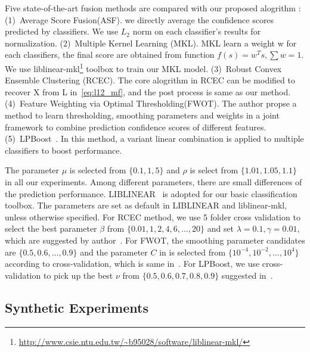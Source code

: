 \documentclass[letterpaper]{article}
\begin{document}


Five state-of-the-art fusion methods are compared with our proposed alogrithm :
(1)~Average Score Fusion(ASF). we directly average the confidence scores predicted by classifiers. We use $L_2$ norm on each classifier's results for normalization.
(2)~Multiple Kernel Learning (MKL).  MKL learn a weight w for each classifiers, the final score are obtained from function $f(s)=w^{T}s, \sum w = 1$. We use liblinear-mkl\footnote{\url{http://www.csie.ntu.edu.tw/~b95028/software/liblinear-mkl/}} toolbox to train our MKL model.
(3)~Robust Convex Ensemble Clustering (RCEC)\cite{gaoijcai2016robust}. The core alogrithm in RCEC can be modified to recover X from L in~\ref{eq:l12_mf}, and the post process is same as our method.
(4)~Feature Weighting via Optimal Thresholding(FWOT)\cite{xuiccv2013feature}. The author propse a method to learn thresholding, smoothing parameters and weights in a joint framework to combine prediction confidence scores of different features.
(5)~LPBoost~\cite{gehler2009feature}. In this method, a variant linear combination is applied to multiple classifiers to boost performance.


The parameter $\mu$ is selected from $\{0.1, 1, 5\}$ and $\rho$ is select from $\{1.01, 1.05, 1.1\}$ in all our experiments.
Among different parameters, there are small differences of the prediction performance.
LIBLINEAR~\cite{fan2008liblinear} is adopted for our basic classification toolbox.
The parameters are set as default in LIBLINEAR and liblinear-mkl, unless otherwise specified.
For RCEC method, we use 5 folder cross validation to select the best parameter $\beta$ from $\{0.01,1,2,4,6,...,20\}$ and set $\lambda = 0.1, \gamma = 0.01$, which are suggested by author~\cite{yiicdm2012robust}.
For FWOT, the smoothing parameter candidates are $\{0.5, 0.6, ... , 0.9\}$ and the parameter $C$ in is selected from $\{10^{-4},10^{-2},...,10^{4}\}$ according to cross-validation, which is same in~\cite{xuiccv2013feature}.
For LPBoost, we use cross-validation to pick up the best $\nu$ from $\{0.5,0.6,0.7,0.8,0.9\}$ suggested in~\cite{xuiccv2013feature}.





\subsection{Synthetic Experiments}
\end{document}

